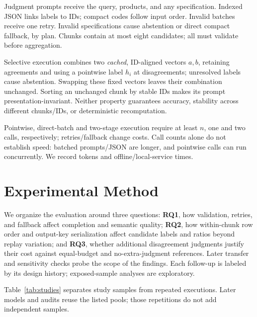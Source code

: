 \documentclass[conference]{IEEEtran}
\begin{document}
Judgment prompts receive the query, products, and any specification. Indexed JSON links labels to IDs; compact codes follow input order. Invalid batches receive one retry. Invalid specifications cause abstention or direct compact fallback, by plan. Chunks contain at most eight candidates; all must validate before aggregation.

Selective execution combines two \emph{cached}, ID-aligned vectors $a,b$, retaining agreements and using a pointwise label $h_i$ at disagreements; unresolved labels cause abstention. Swapping these fixed vectors leaves their combination unchanged. Sorting an unchanged chunk by stable IDs makes its prompt presentation-invariant. Neither property guarantees accuracy, stability across different chunks/IDs, or deterministic recomputation.

Pointwise, direct-batch and two-stage execution require at least $n$, one and two calls, respectively; retries/fallback change costs. Call counts alone do not establish speed: batched prompts/JSON are longer, and pointwise calls can run concurrently. We record tokens and offline/local-service times.

\section{Experimental Method}
We organize the evaluation around three questions: \textbf{RQ1}, how validation, retries, and fallback affect completion and semantic quality; \textbf{RQ2}, how within-chunk row order and output-key serialization affect candidate labels and ratios beyond replay variation; and \textbf{RQ3}, whether additional disagreement judgments justify their cost against equal-budget and no-extra-judgment references. Later transfer and sensitivity checks probe the scope of the findings. Each follow-up is labeled by its design history; exposed-sample analyses are exploratory.

Table~\ref{tab:studies} separates study samples from repeated executions. Later models and audits reuse the listed pools; those repetitions do not add independent samples.
\end{document}
